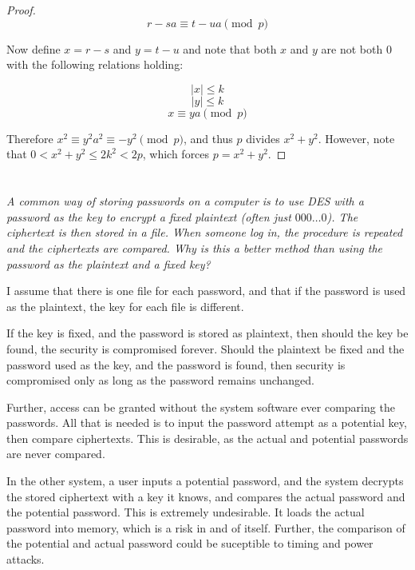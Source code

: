 \documentclass[12pt]{article}
\begin{document}
\begin{description}
\begin{proof}
            $$r - sa \equiv t - ua \pmod{p}$$

            Now define $x = r - s$ and $y = t - u$ and note that both $x$ and $y$ are not both $0$ with the following relations holding:

            $$\vert x \vert \leq k$$
            $$\vert y \vert \leq k$$
            $$x \equiv ya \pmod{p}$$

            Therefore $x^2 \equiv y^2 a^2 \equiv -y^2 \pmod{p}$, and thus $p$ divides $x^2 + y^2$. However, note that $0 < x^2 + y^2 \leq 2k^2 < 2p$, which forces $p = x^2 + y^2$.
        \end{proof}
    \end{description}

\section{} \textit{A common way of storing passwords on a computer is to use DES with a password as the key to encrypt a fixed plaintext (often just $000\dots0$). The ciphertext is then stored in a file. When someone log in, the procedure is repeated and the ciphertexts are compared. Why is this a better method than using the password as the plaintext and a fixed key?}

    I assume that there is one file for each password, and that if the password is used as the plaintext, the key for each file is different.

    If the key is fixed, and the password is stored as plaintext, then should the key be found, the security is compromised forever. Should the plaintext be fixed and the password used as the key, and the password is found, then security is compromised only as long as the password remains unchanged.

    Further, access can be granted without the system software ever comparing the passwords. All that is needed is to input the password attempt as a potential key, then compare ciphertexts. This is desirable, as the actual and potential passwords are never compared.

    In the other system, a user inputs a potential password, and the system decrypts the stored ciphertext with a key it knows, and compares the actual password and the potential password. This is extremely undesirable. It loads the actual password into memory, which is a risk in and of itself. Further, the comparison of the potential and actual password could be suceptible to timing and power attacks.
\end{document}
